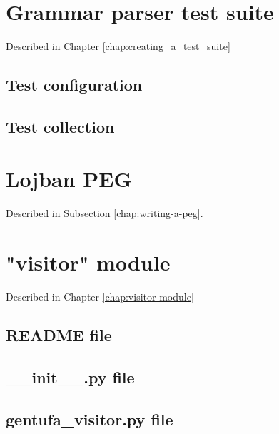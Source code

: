 \chapter{Grammar parser test suite}
\label{appendix:parser-testing-annex}

Described in Chapter \ref{chap:creating_a_test_suite}

\section{Test configuration}



\section{Test collection}



\chapter{Lojban PEG}
\label{appendix:peg-annex}

Described in Subsection \ref{chap:writing-a-peg}.



\chapter{"visitor" module}
\label{appendix:gentufa-visitor-annex}

Described in Chapter \ref{chap:visitor-module}

\section{README file}



\section{\_\_init\_\_.py file}



\section{gentufa\_visitor.py file}

